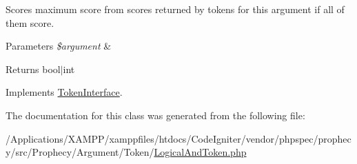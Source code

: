 Scores maximum score from scores returned by tokens for this argument if all of them score.


\begin{DoxyParams}{Parameters}
{\em \$argument} & \\
\hline
\end{DoxyParams}
\begin{DoxyReturn}{Returns}
bool$\vert$int 
\end{DoxyReturn}


Implements \mbox{\hyperlink{interface_prophecy_1_1_argument_1_1_token_1_1_token_interface_a8d5bf47ab6eaa935458d5ad160e52822}{Token\+Interface}}.



The documentation for this class was generated from the following file\+:\begin{DoxyCompactItemize}
\item 
/\+Applications/\+X\+A\+M\+P\+P/xamppfiles/htdocs/\+Code\+Igniter/vendor/phpspec/prophecy/src/\+Prophecy/\+Argument/\+Token/\mbox{\hyperlink{_logical_and_token_8php}{Logical\+And\+Token.\+php}}\end{DoxyCompactItemize}
